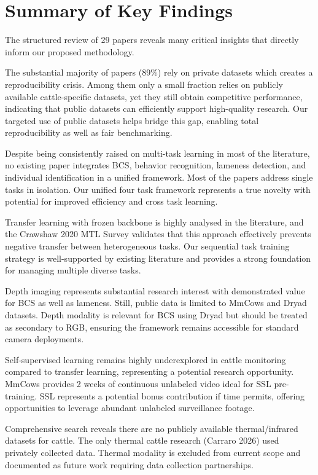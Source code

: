 \section{Summary of Key Findings}

The structured review of 29 papers reveals many critical insights that directly inform our proposed methodology.

The substantial majority of papers (89\%) rely on private datasets which creates a reproducibility crisis. Among them only a small fraction relies on publicly available cattle-specific datasets, yet they still obtain competitive performance, indicating that public datasets can efficiently support high-quality research. Our targeted use of public datasets helps bridge this gap, enabling total reproducibility as well as fair benchmarking.

Despite being consistently raised on multi-task learning in most of the  literature, no existing paper integrates BCS, behavior recognition, lameness detection, and individual identification in a unified framework. Most of the papers address single tasks in isolation. Our unified four task framework represents a true novelty with potential for improved efficiency and cross task learning.

Transfer learning with frozen backbone is highly analysed in the literature, and the Crawshaw 2020 MTL Survey validates that this approach effectively prevents negative transfer between heterogeneous tasks. Our sequential task training strategy is well-supported by existing literature and provides a strong foundation for managing multiple diverse tasks.

Depth imaging represents substantial research interest with demonstrated value for BCS as well as lameness. Still, public data is limited to MmCows and Dryad datasets. Depth modality is relevant for BCS using Dryad but should be treated as secondary to RGB, ensuring the framework remains accessible for standard camera deployments.

Self-supervised learning remains highly underexplored in cattle monitoring compared to transfer learning, representing a potential research opportunity. MmCows provides 2 weeks of continuous unlabeled video ideal for SSL pre-training. SSL represents a potential bonus contribution if time permits, offering opportunities to leverage abundant unlabeled surveillance footage.

Comprehensive search reveals there are no publicly available thermal/infrared datasets for cattle. The only thermal cattle research (Carraro 2026) used privately collected data. Thermal modality is excluded from current scope and documented as future work requiring data collection partnerships.

